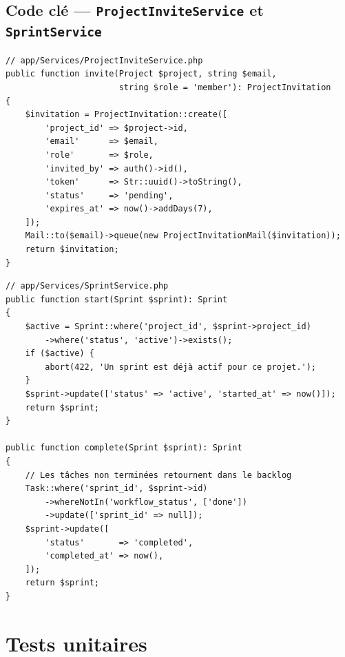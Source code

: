 \subsection{Code clé — \texttt{ProjectInviteService} et \texttt{SprintService}}

\begin{lstlisting}[style=phpstyle,caption={ProjectInviteService::invite() — Invitation par email},label={lst:invite}]
// app/Services/ProjectInviteService.php
public function invite(Project $project, string $email,
                       string $role = 'member'): ProjectInvitation
{
    $invitation = ProjectInvitation::create([
        'project_id' => $project->id,
        'email'      => $email,
        'role'       => $role,
        'invited_by' => auth()->id(),
        'token'      => Str::uuid()->toString(),
        'status'     => 'pending',
        'expires_at' => now()->addDays(7),
    ]);
    Mail::to($email)->queue(new ProjectInvitationMail($invitation));
    return $invitation;
}
\end{lstlisting}

\begin{lstlisting}[style=phpstyle,caption={SprintService — Démarrage et clôture de sprint},label={lst:sprint_service}]
// app/Services/SprintService.php
public function start(Sprint $sprint): Sprint
{
    $active = Sprint::where('project_id', $sprint->project_id)
        ->where('status', 'active')->exists();
    if ($active) {
        abort(422, 'Un sprint est déjà actif pour ce projet.');
    }
    $sprint->update(['status' => 'active', 'started_at' => now()]);
    return $sprint;
}

public function complete(Sprint $sprint): Sprint
{
    // Les tâches non terminées retournent dans le backlog
    Task::where('sprint_id', $sprint->id)
        ->whereNotIn('workflow_status', ['done'])
        ->update(['sprint_id' => null]);
    $sprint->update([
        'status'       => 'completed',
        'completed_at' => now(),
    ]);
    return $sprint;
}
\end{lstlisting}

\section{Tests unitaires}

